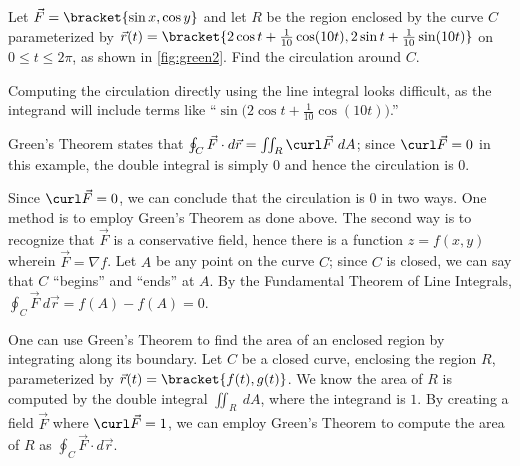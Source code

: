 
{Let $\vec F =\bracket{\sin x,\cos y}$ and let $R$ be the region enclosed by the curve $C$ parameterized by $\vec r(t) =\bracket{2\cos t+ \frac1{10}\cos(10t),2\sin t+\frac1{10}\sin(10t)}$ on $0\leq t\leq 2\pi$, as shown in \autoref{fig:green2}. Find the circulation around $C$.}
{Computing the circulation directly using the line integral looks difficult, as the integrand will include terms like ``$\sin\big(2\cos t + \frac1{10}\cos(10t)\big)$.'' 

Green's Theorem states that $\oint_C\vec F\cdot d\vec r = \iint_R \curl\vec F\ dA$; since $\curl \vec F = 0$ in this example, the double integral is simply 0 and hence the circulation is 0.

Since $\curl \vec F = 0$, we can conclude that the circulation is 0 in two ways. One method is to employ Green's Theorem as done above. The second way is to recognize that $\vec F$ is a conservative field, hence there is a function $z=f(x,y)$ wherein $\vec F = \nabla f$. Let $A$ be any point on the curve $C$; since $C$ is closed, we can say that $C$ ``begins'' and ``ends'' at $A$. By the Fundamental Theorem of Line Integrals, $\oint_C \vec F\ d\vec r = f(A)-f(A) = 0$.}

One can use Green's Theorem to find the area of an enclosed region by integrating along its boundary. Let $C$ be a closed curve, enclosing the region $R$, parameterized by $\vec r(t) =\bracket{f(t),g(t)}$. We know the area of $R$ is computed by the double integral $\iint_R \ dA$, where the integrand is $1$. By creating a field $\vec F$ where $\curl \vec F =1$, we can employ Green's Theorem to compute the area of $R$ as $\oint_C \vec F\cdot d\vec r$. 

